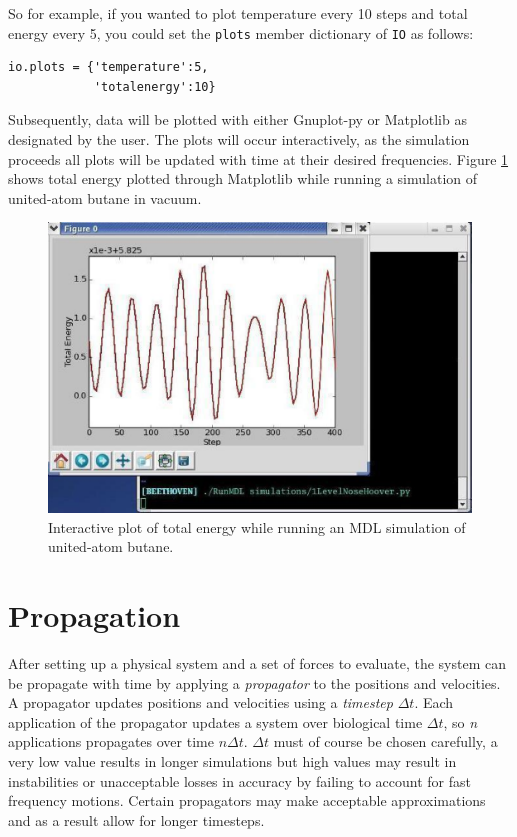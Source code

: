 \documentclass[11pt]{report}
\begin{document}
So for example, if you wanted to plot temperature every 10 steps
and total energy every 5, you could set the \texttt{plots} member
dictionary of \texttt{IO} as follows:

\begin{verbatim}
io.plots = {'temperature':5,
            'totalenergy':10}
\end{verbatim}

Subsequently, data will be plotted with either Gnuplot-py or
Matplotlib as designated by the user.  The plots will occur interactively, 
as the simulation proceeds all plots will be updated with time at their 
desired frequencies.  Figure \ref{fig:matplotlib} shows total energy
plotted through Matplotlib while running a simulation of united-atom
butane in vacuum.

\begin{figure}[htb]
   \centerline{\includegraphics[width=12cm]{matplotlib2.eps}}
   \caption{Interactive plot of total energy while running an MDL simulation of united-atom butane. \label{fig:matplotlib}}
\end{figure}

\section{Propagation}

After setting up a physical system and a set of forces to evaluate,
the system can be propagate with time by applying a {\it propagator}
to the positions and velocities.  A propagator updates positions
and velocities using a {\it timestep} \begin{math}\Delta t\end{math}.
Each application of the propagator updates a system over biological
time \begin{math}\Delta t\end{math}, so {\it n} applications propagates
over time \begin{math} n \Delta t\end{math}.  \begin{math} \Delta t \end{math}
must of course be chosen carefully, a very low value results in longer
simulations but high values may result in instabilities or unacceptable
losses in accuracy by failing to account for fast frequency motions.
Certain propagators may make acceptable approximations and as a result 
allow for longer timesteps.
\end{document}
